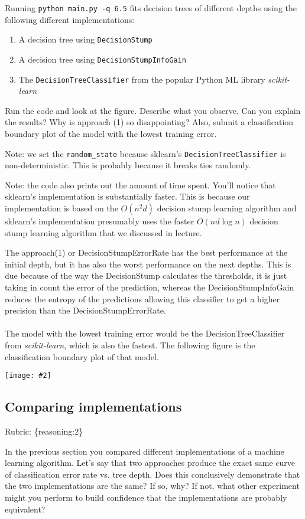 \documentclass{article}
\def\rubric#1{\gre{Rubric: \{#1\}}}{}
\def\blu#1{{\color{blu}#1}}
\def\gre#1{{\color{gre}#1}}
\def\ans#1{{\color{ans}#1}}
\newcommand{\centerfig}[2]{\begin{center}\texttt{[image: \#2]}\end{center}}
\def\enum#1{\begin{enumerate}#1\end{enumerate}}
\begin{document}
Running \texttt{python main.py -q 6.5} fits decision trees of different depths using the following different implementations: 
\enum{
\item A decision tree using \texttt{DecisionStump}
\item A decision tree using \texttt{DecisionStumpInfoGain}
\item The \texttt{DecisionTreeClassifier} from the popular Python ML library \emph{scikit-learn}
}

Run the code and look at the figure.
\blu{Describe what you observe. Can you explain the results?} Why is approach (1) so disappointing? Also, \blu{submit a classification boundary plot of the model with the lowest training error}.

Note: we set the \verb|random_state| because sklearn's \texttt{DecisionTreeClassifier} is non-deterministic. This is probably
because it breaks ties randomly.

Note: the code also prints out the amount of time spent. You'll notice that sklearn's implementation is substantially faster. This is because
our implementation is based on the $O(n^2d)$ decision stump learning algorithm and sklearn's implementation presumably uses the faster $O(nd\log n)$
decision stump learning algorithm that we discussed in lecture.

\ans{
    The approach(1) or DecisionStumpErrorRate has the best performance at the initial depth, 
    but it has also the worst performance on the next depths. This is due because of the
    way the DecisionStump calculates the thresholds, it is just taking in count the error of 
    the prediction, whereas the DecisionStumpInfoGain reduces the entropy of the predictions
    allowing this classifier to get a higher precision than the DecisionStumpErrorRate.
    \\ \\
    The model with the lowest training error would be the DecisionTreeClassifier from \emph{scikit-learn}, 
    which is also the fastest. The following figure is the classification boundary plot of that model.
    \centerfig{0.7}{../figs/q6_5_1_LowestErrorDecisionBoundary}
}

\subsection{Comparing implementations}
\rubric{reasoning:2}

In the previous section you compared different implementations of a machine learning algorithm. Let's say that two
approaches produce the exact same curve of classification error rate vs. tree depth. Does this conclusively demonstrate
that the two implementations are the same? If so, why? If not, what other experiment might you perform to build confidence
that the implementations are probably equivalent?
\end{document}
